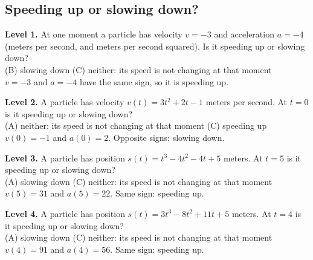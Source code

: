 \documentclass[11pt]{article}
\begin{document}
\subsection*{Speeding up or slowing down?}
\noindent\textbf{Level 1.} At one moment a particle has velocity $v=-3$ and acceleration $a=-4$ (meters per second, and meters per second squared). Is it speeding up or slowing down?\\  \quad (B) slowing down \quad (C) neither: its speed is not changing at that moment\\  \quad $v=-3$ and $a=-4$ have the same sign, so it is speeding up.\par\medskip
\noindent\textbf{Level 2.} A particle has velocity $v(t)=3t^{2}+2t-1$ meters per second. At $t=0$ is it speeding up or slowing down?\\ (A) neither: its speed is not changing at that moment \quad {} \quad (C) speeding up\\  \quad $v(0)=-1$ and $a(0)=2$. Opposite signs: slowing down.\par\medskip
\noindent\textbf{Level 3.} A particle has position $s(t)=t^{3}-4t^{2}-4t+5$ meters. At $t=5$ is it speeding up or slowing down?\\ (A) slowing down \quad {} \quad (C) neither: its speed is not changing at that moment\\  \quad $v(5)=31$ and $a(5)=22$. Same sign: speeding up.\par\medskip
\noindent\textbf{Level 4.} A particle has position $s(t)=3t^{3}-8t^{2}+11t+5$ meters. At $t=4$ is it speeding up or slowing down?\\ (A) slowing down \quad {} \quad (C) neither: its speed is not changing at that moment\\  \quad $v(4)=91$ and $a(4)=56$. Same sign: speeding up.\par\medskip
\end{document}
